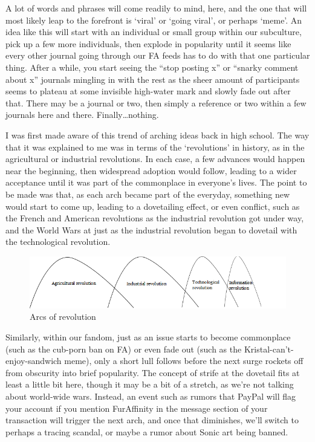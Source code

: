 A lot of words and phrases will come readily to mind, here, and the one that will most likely leap to the forefront is ‘viral' or ‘going viral', or perhaps ‘meme'.  An idea like this will start with an individual or small group within our subculture, pick up a few more individuals, then explode in popularity until it seems like every other journal going through our FA feeds has to do with that one particular thing.  After a while, you start seeing the ``stop posting x'' or ``snarky comment about x'' journals mingling in with the rest as the sheer amount of participants seems to plateau at some invisible high-water mark and slowly fade out after that.  There may be a journal or two, then simply a reference or two within a few journals here and there.  Finally…nothing.

I was first made aware of this trend of arching ideas back in high school.  The way that it was explained to me was in terms of the ‘revolutions' in history, as in the agricultural or industrial revolutions.  In each case, a few advances would happen near the beginning, then widespread adoption would follow, leading to a wider acceptance until it was part of the commonplace in everyone's lives.  The point to be made was that, as each arch became part of the everyday, something new would start to come up, leading to a dovetailing effect, or even conflict, such as the French and American revolutions as the industrial revolution got under way, and the World Wars at just as the industrial revolution began to dovetail with the technological revolution.

\begin{figure}
  \begin{center}
    \includegraphics[width=\textwidth]{content/assets/dramagogues--revolution-arcs}
  \end{center}
  \caption{Arcs of revolution}
\end{figure}

Similarly, within our fandom, just as an issue starts to become commonplace (such as the cub-porn ban on FA) or even fade out (such as the Kristal-can't-enjoy-sandwich meme), only a short lull follows before the next surge rockets off from obscurity into brief popularity.  The concept of strife at the dovetail fits at least a little bit here, though it may be a bit of a stretch, as we're not talking about world-wide wars.  Instead, an event such as rumors that PayPal will flag your account if you mention FurAffinity in the message section of your transaction will trigger the next arch, and once that diminishes, we'll switch to perhaps a tracing scandal, or maybe a rumor about Sonic art being banned.

